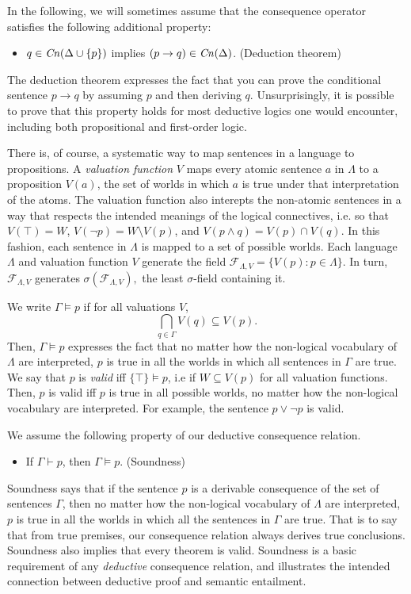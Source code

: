 In the following, we will sometimes assume that the consequence operator
satisfies the following additional property:
\begin{itemize}
\item[] $q\in \text{\textit{Cn}}(\Delta \cup \{p\})$ implies $(p\rightarrow q)\in\text{\textit{Cn}}(\Delta)$.
\hfill (Deduction theorem)
\end{itemize}
The deduction theorem expresses the fact that you can prove the conditional
sentence $p\rightarrow q$ by assuming $p$ and then deriving $q$. Unsurprisingly,
it is possible to prove that this property holds for most deductive logics one
would encounter, including both propositional and first-order logic.

There is, of course, a systematic way to map sentences in a language to
propositions. A {\em valuation function} $V$  maps every atomic sentence $a$ in
$\Lambda$ to a proposition $V(a)$,  the set of worlds in which $a$ is true under
that interpretation of the atoms. The valuation function also interepts the
non-atomic sentences in a way that respects the intended meanings of the logical
connectives, i.e. so that $V(\top)=W$, $V(\neg p)=W\setminus V(p)$, and
$V(p\wedge q)= V(p)\cap V(q).$ In this fashion, each sentence in $\Lambda$ is
mapped to a set of possible worlds. Each language $\Lambda$ and valuation
function $V$ generate the field $\mathcal{F}_{\Lambda,V} =\{ V(p) : p \in
\Lambda \}.$ In turn, $\mathcal{F}_{\Lambda,V}$ generates
$\sigma(\mathcal{F}_{\Lambda,V}),$ the least $\sigma$-field containing it.

We write $\Gamma \vDash p$ if for all valuations $V$, $$\bigcap_{q \in \Gamma}
V(q) \subseteq V(p).$$ Then, $ \Gamma \vDash p$ expresses the fact that no
matter how the non-logical vocabulary of $\Lambda$ are interpreted, $p$ is true
in all the worlds in which all sentences in $\Gamma$ are true. We say that $p$
is {\em valid} iff $\{ \top \} \vDash p$, i.e if $W\subseteq V(p)$ for all
valuation functions. Then, $p$ is valid iff $p$ is true in all possible worlds,
no matter how the non-logical vocabulary are interpreted. For example, the
sentence $p\vee \neg p$ is valid.

We assume the following property of our deductive consequence relation.
\begin{itemize}
\item[] If $\Gamma \vdash p$, then $\Gamma \vDash p$. \hfill(Soundness)
\end{itemize}
{Soundness} says that if the sentence $p$ is a derivable consequence of the set
of sentences $\Gamma$, then no matter how the non-logical vocabulary of
$\Lambda$ are interpreted, $p$ is true in all  the worlds in which all the
sentences in $\Gamma$ are true. That is to say that from true premises, our
consequence relation always derives true conclusions.  {Soundness} also implies
that every theorem is valid.  {Soundness} is a basic requirement of any {\em
deductive} consequence relation, and illustrates the intended connection between
deductive proof and semantic entailment.

